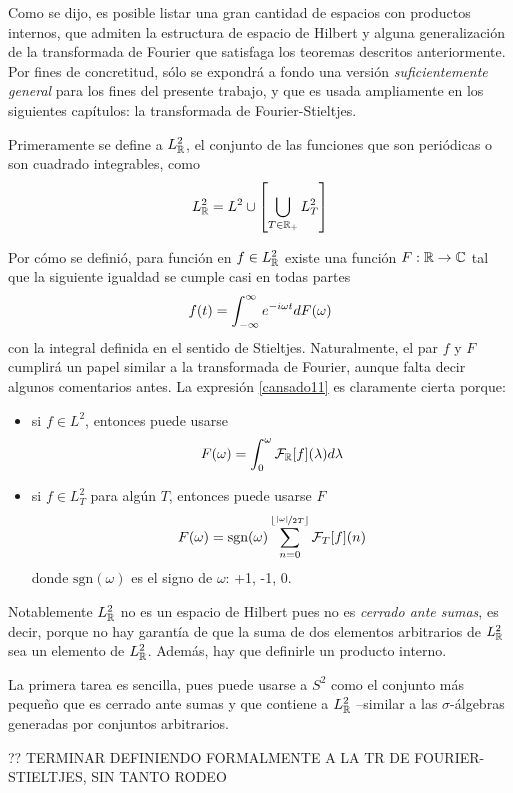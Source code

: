 Como se dijo, es posible listar una gran cantidad de espacios con productos internos, que admiten la estructura de espacio de Hilbert y alguna generalización de la transformada de Fourier que satisfaga los teoremas descritos anteriormente.
%
Por fines de concretitud, sólo se expondrá a fondo una versión \textit{suficientemente general} para los fines del presente trabajo, y que es usada ampliamente en los siguientes capítulos: la transformada de Fourier-Stieltjes.

Primeramente se define a $L^{2}_{\mathbb{R}}$, el conjunto de las funciones que son periódicas o son cuadrado integrables, como
\begin{equation}
L^{2}_{\mathbb{R}} = L^{2} \cup \left[ \bigcup_{T\in \mathbb{R}_+} L^{2}_T \right]
\end{equation}

Por cómo se definió, para función en $f \in L^{2}_{\mathbb{R}}$ existe una función $F: \mathbb{R} \rightarrow \mathbb{C}$ tal que la siguiente igualdad se cumple casi en todas partes
\begin{equation}
f(t) = \int_{-\infty}^{\infty} e^{-i \omega t} dF(\omega)
\label{cansado11}
\end{equation}
con la integral definida en el sentido de Stieltjes.
%
Naturalmente, el par $f$ y $F$ cumplirá un papel similar a la transformada de Fourier, aunque falta decir algunos comentarios antes.
%
La expresión \ref{cansado11} es claramente cierta porque:
\begin{itemize}
\item si $f \in L^{2}$, entonces puede usarse 
\begin{equation*}
F(\omega)=\int_{0}^{\omega} \mathcal{F}_{\mathbb{R}}[f](\lambda) d\lambda
\end{equation*}
\item si $f \in L^{2}_T$ para algún $T$, entonces puede usarse $F$
\begin{equation*}
F(\omega) =  \text{sgn}(\omega) \sum_{n = 0}^{\left\lfloor \nicefrac{\left| \omega \right|}{2T} \right\rfloor} \mathcal{F}_T[f](n)
\end{equation*}
donde $\text{sgn}(\omega)$ es el signo de $\omega$: +1, -1, 0. 
\end{itemize}

Notablemente $L^{2}_{\mathbb{R}}$ no es un espacio de Hilbert pues no es \textit{cerrado ante sumas}, es decir, porque no hay garantía de que la suma de dos elementos arbitrarios de $L^{2}_{\mathbb{R}}$ sea un elemento de $L^{2}_{\mathbb{R}}$.
%
Además, hay que definirle un producto interno.

La primera tarea es sencilla, pues puede usarse a $S^{2}$ como el conjunto más pequeño que es cerrado ante sumas y que contiene a $L^{2}_{\mathbb{R}}$ --similar a las $\sigma$-álgebras generadas por conjuntos arbitrarios.

?? TERMINAR DEFINIENDO FORMALMENTE A LA TR DE FOURIER-STIELTJES, SIN TANTO RODEO

